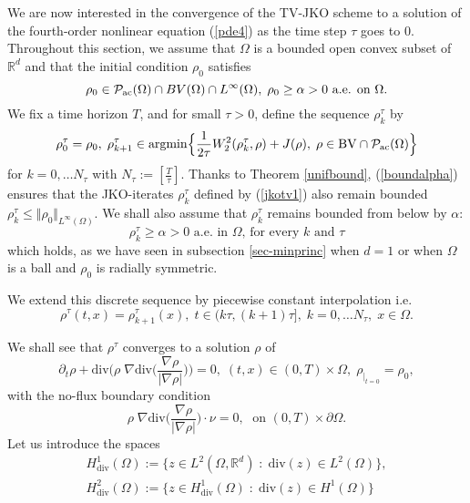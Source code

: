 \documentclass[12pt, a4paper]{article}
\numberwithin{equation}{section}
\theoremstyle{plain}
\theoremstyle{definition}
\theoremstyle{remark}
\newcommand\PPa{{\cal P}_{\rm{ac}}(\Omega)}
\newcommand{\R}{\mathbb{R}}
\newcommand{\BV}{\mathrm{BV}}
\newcommand{\dive}{\mathrm{div}}
\newcommand{\argmin}{\mathrm{argmin}}
\newcommand\pref[1]{(\ref{#1})}
\begin{document}
We are now interested in the convergence of the TV-JKO scheme to a solution of the fourth-order nonlinear equation \pref{pde4} as the time step $\tau$ goes to $0$. Throughout this section, we assume that $\Omega$ is a bounded open convex subset of $\R^d$ and that the initial condition $\rho_0$ satisfies 
\begin{equation}\label{boundalpha}
\rho_0 \in \PPa \cap BV(\Omega)\cap L^{\infty}(\Omega), \; \rho_0 \ge \alpha >0 \mbox{ a.e. on $\Omega$}.
\end{equation}
We fix a time horizon $T$, and for small $\tau>0$, define the sequence $\rho_k^\tau$ by
\begin{equation}\label{jkotv1}
\rho_0^\tau=\rho_0, \; \rho_{k+1}^\tau \in \argmin  \Big\{ \frac{1}{2\tau} W_2^2(\rho_{k}^\tau, \rho)+ J(\rho), \; \rho \in \BV\cap \PPa\Big\}
\end{equation}
for $k=0, \ldots N_\tau$ with $N_\tau:=[\frac{T}{\tau}]$.  Thanks to Theorem \ref{unifbound}, \pref{boundalpha} ensures that the JKO-iterates $\rho_k^{\tau}$ defined by \pref{jkotv1} also remain bounded $\rho_k^{\tau} \le \Vert \rho_0\Vert_{L^\infty(\Omega)}$.  We shall also assume that $\rho_k^\tau$ remains bounded from below by $\alpha$:
\begin{equation}\label{extraassumption}
\rho_k^\tau \ge \alpha>0 \mbox{ a.e. in $\Omega$, for every $k$ and $\tau$}
\end{equation}
which holds, as we have seen in subsection \ref{sec-minprinc} when $d=1$ or when $\Omega$ is a ball and $\rho_0$ is radially symmetric. 


\smallskip


We extend this discrete sequence by piecewise constant interpolation i.e. 
\begin{equation}\label{extend}
\rho^{\tau}(t,x)=\rho_{k+1}^\tau(x), \; t \in (k\tau, (k+1)\tau], \; k=0, \ldots N_\tau, \; x\in \Omega.
\end{equation}

We shall see that $\rho^\tau$ converges  to a solution $\rho$ of
\begin{equation}\label{pde41}
\partial_t \rho + \dive \Big(\rho \;  \nabla  \dive  \Big( \frac{\nabla \rho}{\vert \nabla \rho \vert} \Big)  \Big)       =0, \; (t,x)\in (0,T)\times \Omega, \; \rho_{\vert_{t=0}}=\rho_0, 
\end{equation}
with the no-flux boundary condition
\begin{equation}\label{no-flux}
\rho \;  \nabla  \dive  \Big( \frac{\nabla \rho}{\vert \nabla \rho \vert} \Big) \cdot \nu=0 , \; \mbox{ on }  (0,T)\times \partial \Omega. 
\end{equation}
Let us introduce the spaces 
\[\begin{split}
H^1_{\dive}(\Omega):=\{z\in L^2(\Omega, \R^d) \; : \; \dive(z)\in L^2(\Omega)\},\\ 
H^2_{\dive}(\Omega):= \{z\in H^1_{\dive}(\Omega)  \; : \; \dive(z)\in H^1(\Omega)\}
\end{split}\]
\end{document}
